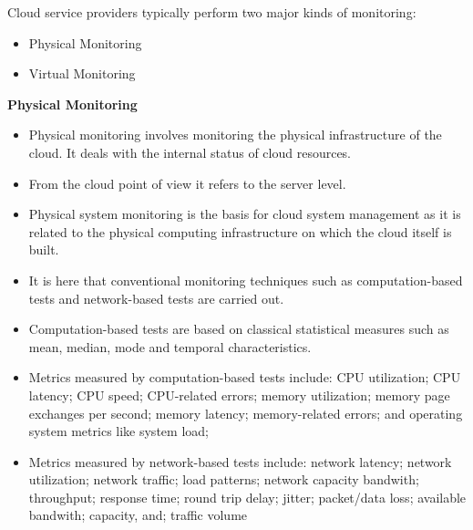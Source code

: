 \documentclass[a4paper, 12pt]{article}
\begin{document}
Cloud service providers typically perform two major kinds of monitoring:
\begin{itemize}
\item
Physical Monitoring
\item
Virtual Monitoring
\end{itemize}

\textbf{Physical Monitoring}
\begin{itemize}
\item
Physical monitoring involves monitoring the physical infrastructure of the cloud. It deals with the internal status of cloud resources. 
\item
From the cloud point of view it refers to the server level. 
\item
Physical system monitoring is the basis for cloud system management as it is related to the physical computing infrastructure on which the cloud itself is built.
\item
It is here that conventional monitoring techniques such as computation-based tests and network-based tests are carried out.
\item
Computation-based tests are based on classical statistical measures such as mean, median, mode and temporal characteristics.
\item
Metrics measured by computation-based tests include: CPU utilization; CPU latency; CPU speed; CPU-related errors; memory utilization; memory page exchanges per second; memory latency; memory-related errors; and operating system metrics like system load;
\item
Metrics measured by network-based tests include: network latency; network utilization; network traffic; load patterns; network capacity bandwith; throughput; response time; round trip delay; jitter; packet/data loss; available bandwith; capacity, and; traffic volume
\end{itemize}
\end{document}
